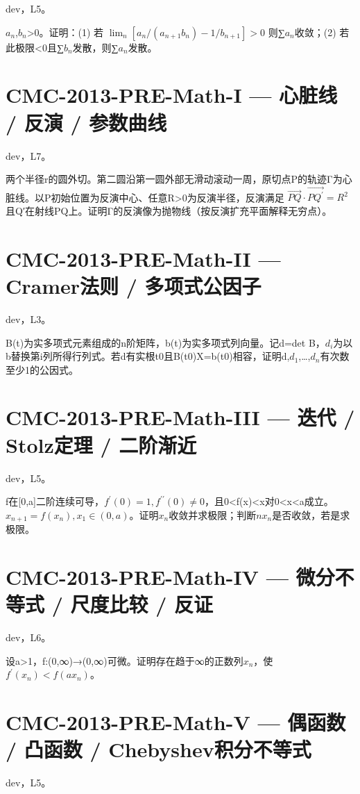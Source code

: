 \documentclass[UTF8]{ctexart}
\begin{document}
dev，L5。

$a_n$,$b_n$>0。证明：(1) 若 $\lim_n[a_n/(a_{n+1}b_n)-1/b_{n+1}]>0$ 则∑$a_n$收敛；(2) 若此极限<0且∑$b_n$发散，则∑$a_n$发散。

\section*{CMC-2013-PRE-Math-I — 心脏线 / 反演 / 参数曲线}

dev，L7。

两个半径r的圆外切。第二圆沿第一圆外部无滑动滚动一周，原切点P的轨迹Γ为心脏线。以P初始位置为反演中心、任意R>0为反演半径，反演满足 $\overrightarrow{PQ}\cdot\overrightarrow{PQ^{\prime}}=R^2$ 且Q′在射线PQ上。证明Γ的反演像为抛物线（按反演扩充平面解释无穷点）。

\section*{CMC-2013-PRE-Math-II — Cramer法则 / 多项式公因子}

dev，L3。

B(t)为实多项式元素组成的n阶矩阵，b(t)为实多项式列向量。记d=det B，$d_i$为以b替换第i列所得行列式。若d有实根t0且B(t0)X=b(t0)相容，证明d,$d_1$,…,$d_n$有次数至少1的公因式。

\section*{CMC-2013-PRE-Math-III — 迭代 / Stolz定理 / 二阶渐近}

dev，L5。

f在[0,a]二阶连续可导，$f^{\prime}(0)=1,f^{\prime\prime}(0)\ne0$，且0<f(x)<x对0<x<a成立。$x_{n+1}=f(x_n),x_1\in(0,a)$。证明$x_n$收敛并求极限；判断$nx_n$是否收敛，若是求极限。

\section*{CMC-2013-PRE-Math-IV — 微分不等式 / 尺度比较 / 反证}

dev，L6。

设a>1，f:(0,∞)→(0,∞)可微。证明存在趋于∞的正数列$x_n$，使 $f^{\prime}(x_n)<f(ax_n)$。

\section*{CMC-2013-PRE-Math-V — 偶函数 / 凸函数 / Chebyshev积分不等式}

dev，L5。
\end{document}
